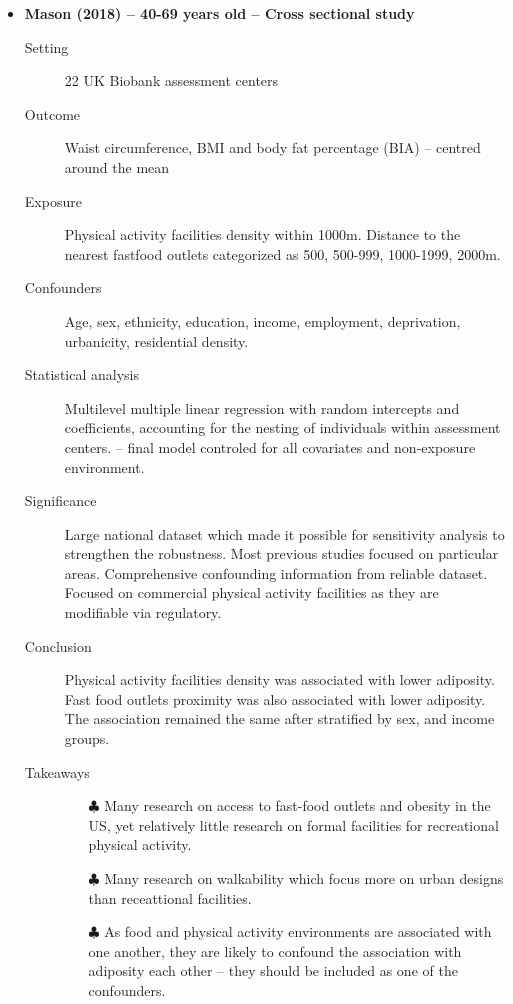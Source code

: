 \documentclass{article}
\begin{document}
\begin{itemize}
	\item {\bf Mason (2018) -- 40-69 years old -- Cross sectional study}
		\begin{description}
			\item[Setting] 22 UK Biobank assessment centers
			\item[Outcome] Waist circumference, BMI and body fat percentage (BIA) -- centred around the mean  	
			\item[Exposure] Physical activity facilities density within 1000m. Distance to the nearest fastfood outlets categorized as 500, 500-999, 1000-1999, 2000m.
			\item[Confounders] Age, sex, ethnicity, education, income, employment, deprivation, urbanicity, residential density.
			\item[Statistical analysis] Multilevel multiple linear regression with random intercepts and coefficients, accounting for the nesting of individuals within assessment centers. -- final model controled for all covariates and non-exposure environment.
			\item[Significance] Large national dataset which 
			made it possible for sensitivity analysis to strengthen the robustness. Most previous studies focused on particular areas. Comprehensive confounding information from reliable dataset. Focused on commercial physical activity facilities as they are modifiable via regulatory.
    			\item[Conclusion] Physical activity facilities density was associated with lower adiposity. Fast food outlets proximity was also associated with lower adiposity. The association remained the same after stratified by sex, and income groups.
					\item[Takeaways] \mbox{}\par
    				\begin{itemize}
    					\item[$\clubsuit$] Many research on access to fast-food outlets and obesity in the US, yet relatively little research on formal facilities for recreational physical activity.
    					\item[$\clubsuit$] Many research on walkability which focus more on urban designs than receattional facilities.
    					\item[$\clubsuit$] As food and physical activity environments are associated with one another, they are likely to confound the association with adiposity each other -- they should be included as one of the confounders. 
    				\end{itemize}	
		\end{description}


\end{itemize}
\end{document}
